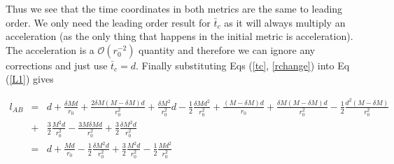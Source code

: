\documentclass[aps,showpacs,onecolumn,floats,prd,superscriptaddress,nofootinbib]{revtex4-1}
\begin{document}
Thus we see that the time coordinates in both metrics are the same to leading order. We only need the leading order result for $\bar{t}_c$ as it will always multiply an acceleration (as the only thing that happens in the initial metric is acceleration). The acceleration is a $\mathcal{O}(r_0^{-2})$ quantity and therefore we can ignore any corrections and just use $\bar{t}_c = d$. 
Finally substituting Eqs (\ref{tc}, \ref{rchange}) into Eq (\ref{L1}) gives

\begin{eqnarray}
	l_{AB} & = & d + \frac{\delta M d}{r_0} + \frac{2\delta M(M - \delta M)d}{r_0^2} + \frac{\delta M^2}{r_0^2} d - \frac{1}{2} \frac{\delta M d^2}{r_0^2} + \frac{(M - \delta M)d}{r_0} + \frac{\delta M(M - \delta M) d}{r_0^2} - \frac{1}{2} \frac{d^2(M - \delta M)}{r_0^2} 	\nonumber	\\
	& + & \frac{3}{2} \frac{M^2 d}{r_0^2} - \frac{3 M \delta M d}{r_0^2} + \frac{3}{2} \frac{\delta M^2 d}{r_0^2}	\nonumber	\\
	& = & d + \frac{M d}{r_0} - \frac{1}{2} \frac{\delta M^2 d}{r_0^2} + \frac{3}{2} \frac{M^2 d}{r_0^2} -\frac{1}{2} \frac{Md^2}{r_0^2}	\label{lenfin}
\end{eqnarray}
\end{document}
